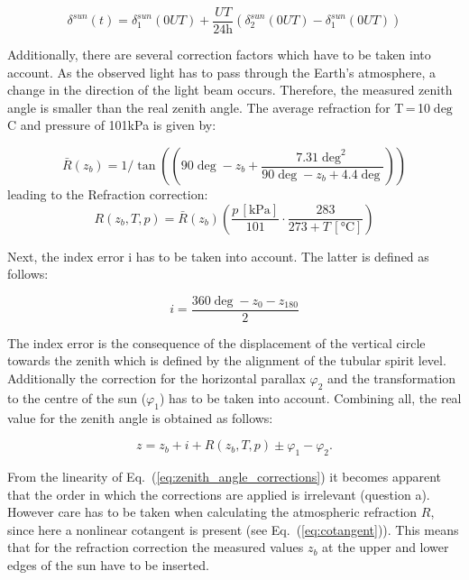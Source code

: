 \begin{equation}
    \delta^{sun}(t) = \delta^{sun}_1(0UT) + \frac{UT}{\text{24h}}(\delta^{sun}_2(0UT)-\delta^{sun}_1(0UT))
\end{equation}

Additionally, there are several correction factors which have to be taken into account. As the observed light has to pass through the Earth's atmosphere, a change in the direction of the light beam occurs. Therefore, the measured zenith angle is smaller than the real zenith angle. The average refraction for T\,=\,10$\deg$C and pressure of 101kPa is given by:

\begin{equation}
    \bar{R}(z_b) = 1/\tan((90 \deg - z_b + \frac{7.31 \deg^2}{90\deg - z_b + 4.4 \deg})) \label{eq:cotangent}
\end{equation}
 leading to the Refraction correction: 
\begin{equation}
    R(z_b, T, p) = \bar{R}(z_b) \left( \frac{p\, [\si{\kPa}]}{101} \cdot \frac{283}{273 + T\, [\si{\celsius}]} \right)
\end{equation}

Next, the index error i has to be taken into account. The latter is defined as follows:

\begin{equation}
    i = \frac{360 \deg - z_0 - z_{180}}{2}
\end{equation}

The index error is the consequence of the displacement of the
vertical circle towards the zenith which is defined by the alignment of
the tubular spirit level. Additionally the correction for the horizontal parallax $\varphi_2$ and the transformation to the centre of the sun ($\varphi_1$) has to be taken into account. Combining all, the real value for the zenith angle is obtained as follows:

\begin{equation}
    \boxed{
        z = z_b + i + R(z_b, T, p) \pm \varphi_1
- \varphi_2    }. \label{eq:zenith_angle_corrections}
\end{equation}

From the linearity of Eq.~(\ref{eq:zenith_angle_corrections}) it becomes apparent that the order in which the corrections are applied is irrelevant (question a). 
However care has to be taken when calculating the atmospheric refraction $R$, since here a nonlinear cotangent is present (see Eq.~(\ref{eq:cotangent})). This means that for the refraction correction the measured values $z_b$ at the upper and lower edges of the sun have to be inserted.
